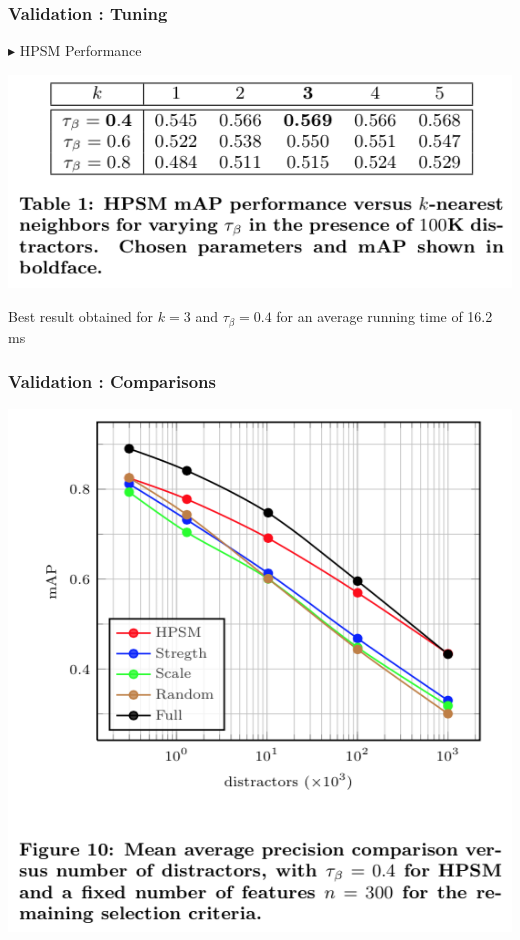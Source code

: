 \documentclass[11pt]{beamer}
\begin{document}
\begin{frame}
\frametitle{Validation : Tuning}
$\blacktriangleright$ HPSM Performance
\begin{center}
\includegraphics[scale=0.8]{table1}
\end{center}
Best result obtained for $k = 3$ and $\tau_\beta = 0.4$ for an average running time of 16.2 ms
\end{frame}

\begin{frame}
\frametitle{Validation : Comparisons}
\begin{center}
\includegraphics[scale=0.55]{figure10}
\end{center}

\end{frame}
\end{document}

